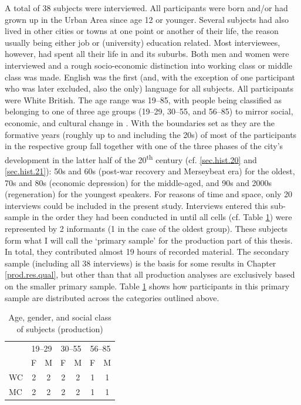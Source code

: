 A total of 38 subjects were interviewed.
All participants were born and/or had grown up in the  Urban Area since age 12 or younger.
Several subjects had also lived in other cities or towns at one point or another of their life, the reason usually being either job or (university) education related.
Most interviewees, however, had spent all their life in  and its suburbs.
Both men and women were interviewed and a rough socio-economic distinction into working class or middle class was made.
English was the first (and, with the exception of one participant who was later excluded, also the only) language for all subjects.
All participants were White British.
The age range was 19--85, with people being classified as belonging to one of three age groups (19--29, 30--55, and 56--85) to mirror social, economic, and cultural change in .
With the boundaries set as they are the formative years (roughly up to and including the 20s) of most of the participants in the respective group fall together with one of the three phases of the city's development in the latter half of the 20\textsuperscript{th} century (cf. \ref{sec.hist.20} and \ref{sec.hist.21}): 50s and 60s (post-war recovery and Merseybeat era) for the oldest, 70s and 80s (economic depression) for the middle-aged, and 90s and 2000s (regeneration) for the youngest speakers.
For reasons of time and space, only 20 interviews could be included in the present study.
Interviews entered this sub-sample in the order they had been conducted in until all cells (cf. Table \ref{tab.participants}) were represented by 2 informants (1 in the case of the oldest group).
These subjects form what I will call the `primary sample' for the production part of this thesis.
In total, they contributed almost 19 hours of recorded material.
The secondary sample (including all 38 interviews) is the basis for some results in Chapter \ref{prod.res.qual}, but other than that all production analyses are exclusively based on the smaller primary sample.
Table \ref{tab.participants} shows how participants in this primary sample are distributed across the categories outlined above.

	\begin{table}[h]
		\centering
		\caption{Age, gender, and social class of subjects (production)}
		\label{tab.participants}
		\begin{tabular}{lcccccc}
			\hline
			& \multicolumn{2}{c}{19--29} & \multicolumn{2}{c}{30--55} & \multicolumn{2}{c}{56--85}\\
			& F & M & F & M & F & M\\
			\hline
			WC & 2 & 2 & 2 & 2 & 1 & 1\\
			MC & 2 & 2 & 2 & 2 & 1 & 1\\
			\hline
		\end{tabular}
	\end{table}

